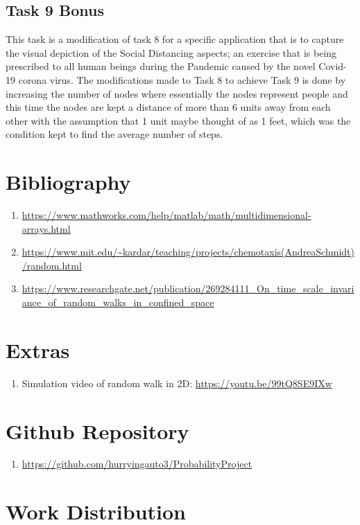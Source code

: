\documentclass{article}
\begin{document}
\subsection{Task 9 Bonus}
This task is a modification of task 8 for a specific application that is to capture the visual depiction of the Social Distancing aspects; an exercise that is being prescribed to all human beings during the Pandemic caused by the novel Covid-19 corona virus. The modifications made to Task 8 to achieve Task 9 is done by increasing the number of nodes where essentially the nodes represent people and this time the nodes are kept a distance of more than 6 units away from each other with the assumption that 1 unit maybe thought of as 1 feet, which was the condition kept to find the average number of steps.


\newpage
\section{Bibliography}

\begin{enumerate}
    \item \url{https://www.mathworks.com/help/matlab/math/multidimensional-arrays.html}
    \item \url{https://www.mit.edu/~kardar/teaching/projects/chemotaxis(AndreaSchmidt)/random.html}
    \item \url{https://www.researchgate.net/publication/269284111_On_time_scale_invariance_of_random_walks_in_confined_space}
\end{enumerate}

\section{Extras}
\begin{enumerate}
    \item Simulation video of random walk in 2D: \url{https://youtu.be/99tQ8SE9IXw}
\end{enumerate}

\section{Github Repository}
\begin{enumerate}
    \item \url{https://github.com/hurryingauto3/ProbabilityProject}
\end{enumerate}


\section{Work Distribution}
\end{document}
